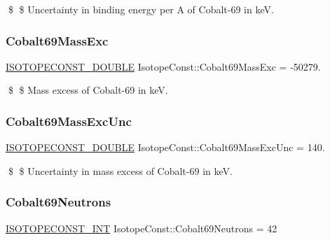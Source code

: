 \$ \$ Uncertainty in binding energy per A of Cobalt-\/69 in keV. \mbox{\label{group___isotope_const-_cobalt-_co69_ga4d2c6843a27ff72b7046466d4f37a79a}} 
\subsubsection{\texorpdfstring{Cobalt69\+Mass\+Exc}{Cobalt69MassExc}}
{\footnotesize\ttfamily \mbox{\hyperlink{group___isotope_const-_macros_ga8f45a7272ce02c0b4c65c44636ed719a}{I\+S\+O\+T\+O\+P\+E\+C\+O\+N\+S\+T\+\_\+\+D\+O\+U\+B\+LE}} Isotope\+Const\+::\+Cobalt69\+Mass\+Exc = -\/50279.}

\$ \$ Mass excess of Cobalt-\/69 in keV. \mbox{\label{group___isotope_const-_cobalt-_co69_ga963d360873216831ff4fc3296fb1f7f6}} 
\subsubsection{\texorpdfstring{Cobalt69\+Mass\+Exc\+Unc}{Cobalt69MassExcUnc}}
{\footnotesize\ttfamily \mbox{\hyperlink{group___isotope_const-_macros_ga8f45a7272ce02c0b4c65c44636ed719a}{I\+S\+O\+T\+O\+P\+E\+C\+O\+N\+S\+T\+\_\+\+D\+O\+U\+B\+LE}} Isotope\+Const\+::\+Cobalt69\+Mass\+Exc\+Unc = 140.}

\$ \$ Uncertainty in mass excess of Cobalt-\/69 in keV. \mbox{\label{group___isotope_const-_cobalt-_co69_gac68d82f2b13ec0deffcc9f8669e8f01b}} 
\subsubsection{\texorpdfstring{Cobalt69\+Neutrons}{Cobalt69Neutrons}}
{\footnotesize\ttfamily \mbox{\hyperlink{group___isotope_const-_macros_ga5f18360b3e99483a35c32d789e62621c}{I\+S\+O\+T\+O\+P\+E\+C\+O\+N\+S\+T\+\_\+\+I\+NT}} Isotope\+Const\+::\+Cobalt69\+Neutrons = 42}

